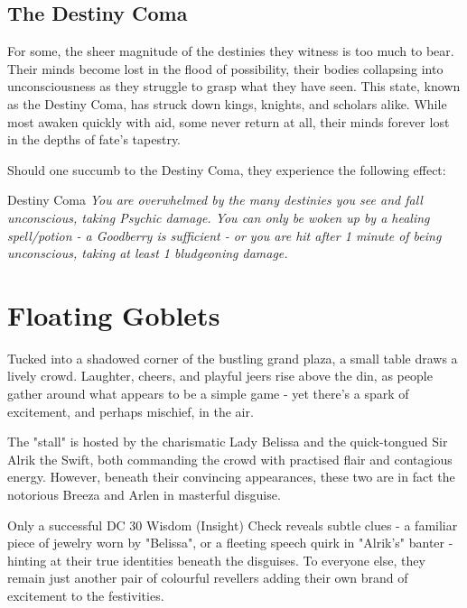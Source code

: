 \subsection*{The Destiny Coma}
{\entryfont For some, the sheer magnitude of the destinies they witness is too much to bear. Their minds become lost in the flood of possibility, their bodies collapsing into unconsciousness as they struggle to grasp what they have seen. This state, known as the Destiny Coma, has struck down kings, knights, and scholars alike. While most awaken quickly with aid, some never return at all, their minds forever lost in the depths of fate's tapestry.

Should one succumb to the Destiny Coma, they experience the following effect:}
\begingroup
	\DndSetThemeColor[PhbMauve]
	\begin{DndComment}{Destiny Coma}
		\textit{You are overwhelmed by the many destinies you see and fall unconscious, taking  Psychic damage. You can only be woken up by a healing spell/potion - a Goodberry is sufficient - or you are hit after 1 minute of being unconscious, taking at least 1 bludgeoning damage.}
	\end{DndComment}
\endgroup

\vfill\eject

\section*{Floating Goblets}
{\entryfont Tucked into a shadowed corner of the bustling grand plaza, a small table draws a lively crowd. Laughter, cheers, and playful jeers rise above the din, as people gather around what appears to be a simple game - yet there's a spark of excitement, and perhaps mischief, in the air.

The "stall" is hosted by the charismatic Lady Belissa and the quick-tongued Sir Alrik the Swift, both commanding the crowd with practised flair and contagious energy. However, beneath their convincing appearances, these two are in fact the notorious Breeza and Arlen in masterful disguise.

Only a successful DC 30 Wisdom (Insight) Check reveals subtle clues - a familiar piece of jewelry worn by "Belissa", or a fleeting speech quirk in "Alrik's" banter - hinting at their true identities beneath the disguises. To everyone else, they remain just another pair of colourful revellers adding their own brand of excitement to the festivities.}


